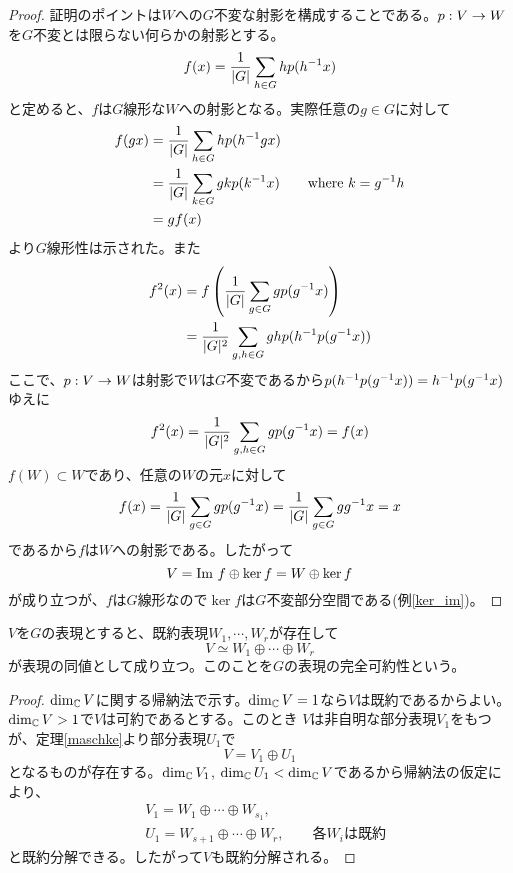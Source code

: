 \documentclass{ltjsreport}
\begin{document}
  \begin{proof}
    証明のポイントは$W$への$G$不変な射影を構成することである。$p:V\rightarrow W$を$G$不変とは限らない何らかの射影とする。
    \[
    f(x)=\frac{1}{|G|}\sum_{h\in G} hp(h^{-1}x)
    \]
    と定めると、$f$は$G$線形な$W$への射影となる。実際任意の$g\in G$に対して
    \begin{align*}
      f(gx)&=\frac{1}{|G|}\sum_{h\in G} hp(h^{-1}gx)\\
      &=\frac{1}{|G|}\sum_{k\in G} gkp(k^{-1}x)\qquad \text{where $k=g^{-1}h$}\\
      &=gf(x)
    \end{align*}
    より$G$線形性は示された。また
    \begin{align*}
      f^2(x)&=f\left(\frac{1}{|G|}\sum_{g\in G}gp(g^{-1}x)\right)\\
      &=\frac{1}{|G|^2}\sum_{g,h\in G}ghp(h^{-1}p(g^{-1}x))
    \end{align*}
    ここで、$p:V\rightarrow W$は射影で$W$は$G$不変であるから$p(h^{-1}p(g^{-1}x))=h^{-1}p(g^{-1}x)$ゆえに
    \begin{align*}
      f^2(x)=\frac{1}{|G|^2}\sum_{g,h\in G}gp(g^{-1}x)=f(x)
    \end{align*}
    $f(W)\subset W$であり、任意の$W$の元$x$に対して
    \[
    f(x)=\frac{1}{|G|}\sum_{g\in G}gp(g^{-1}x)=\frac{1}{|G|}\sum_{g\in G}gg^{-1}x=x  
    \]
    であるから$f$は$W$への射影である。したがって
    \[
    V=\text{Im } f\oplus \ker f=W\oplus \ker f  
    \]
    が成り立つが、$f$は$G$線形なので$\ker f$は$G$不変部分空間である(例\ref{ker_im})。
  \end{proof}


\begin{cor}\label{irr_decompose}
  $V$を$G$の表現とすると、既約表現$W_1,\cdots,W_r$が存在して
  \[
  V\simeq W_1\oplus\cdots\oplus W_r  
  \]
  が表現の同値として成り立つ。このことを$G$の表現の完全可約性という。
\end{cor}

\begin{proof}
  $\dim_{\mathbb{C}} V$に関する帰納法で示す。$\dim_{\mathbb{C}} V=1$なら$V$は既約であるからよい。$\dim_{\mathbb{C}} V>1$で$V$は可約であるとする。このとき
  $V$は非自明な部分表現$V_1$をもつが、定理\ref{maschke}より部分表現$U_1$で
  \[
  V=V_1\oplus U_1  
  \]
  となるものが存在する。$\dim_{\mathbb{C}} V_1$, $\dim_{\mathbb{C}} U_1<\dim_{\mathbb{C}} V$であるから帰納法の仮定により、
  \begin{align*}
    &V_1=W_1\oplus\cdots\oplus W_{s_1},\\
    &U_1=W_{s+1}\oplus\cdots\oplus W_{r},\qquad\text{各$W_i$は既約}
  \end{align*}
  と既約分解できる。したがって$V$も既約分解される。
\end{proof}
\end{document}
